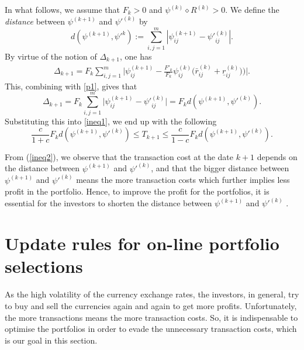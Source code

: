 \documentclass[11pt]{article}
\numberwithin{equation}{section}
\begin{document}
In what follows, we assume that $F_k>0$  and $\psi^{(k)}\diamond R^{(k)}>0.$ 
We define the {\it distance} between $\psi^{(k+1)}$ and $\psi'^{(k)}$  by
\begin{equation}\label{distance}
d(\psi^{(k+1)},\psi'^k):=\sum_{i,j=1}^{m}|\psi^{(k+1)}_{ij}-\psi'^{(k)}_{ij}|.
\end{equation}
By virtue of the notion of $\Delta _{k+1}$, one has 
\begin{equation*}
\begin{split}
\Delta _{k+1}=F_k\sum_{i,j=1}^{m} \Big|\psi^{(k+1)}_{ij}-\frac{F'_k}{F_k}\psi^{(k)}_{ij}\Big(\bar r^{(k)}_{ij}+\underline r^{(k)}_{ij}\Big)\Big)\Big|.
\end{split}
\end{equation*}
This, combining with \eqref{p1}, gives that 
\begin{equation*}
\Delta _{k+1}=F_k\sum_{i,j=1}^{m} \Big|\psi^{(k+1)}_{ij}-{\psi'}^{(k)}_{ij}\Big|=F_kd(\psi^{(k+1)},\psi'^{(k)}).
\end{equation*}
Substituting this into \eqref{ineq1}, we end up with the following 
\begin{equation}\label{ineq2}
\frac{c}{1+c} F_kd(\psi^{(k+1)},\psi'^{(k)}) \leqslant T_{k+1} \leqslant \frac{c}{1-c}F_kd(\psi^{(k+1)},\psi'^{(k)}).
\end{equation}

From (\ref{ineq2}),  we observe that the transaction cost at the date $k+1$ depends on the distance between $\psi^{(k+1)}$ and $\psi'^{(k)}$, and that  the  bigger distance 
between $\psi^{(k+1)}$ and $\psi'^{(k)}$ means the more transaction costs which further implies  less profit in the portfolio. Hence, to improve the profit for  the portfolios, it is 
essential for the investors  to shorten the distance between  $\psi^{(k+1)}$ and $\psi'^{(k)}$ . 

\section{Update rules for on-line portfolio selections}
As the high volatility of the currency exchange rates, the investors, in general,  try to buy and sell the currencies again and again to get more profits. Unfortunately, the more transactions 
means the more transaction costs. So, it is indispensable to optimise the portfolios in order  to evade  the unnecessary transaction costs, which is our goal in this section. 
\end{document}
